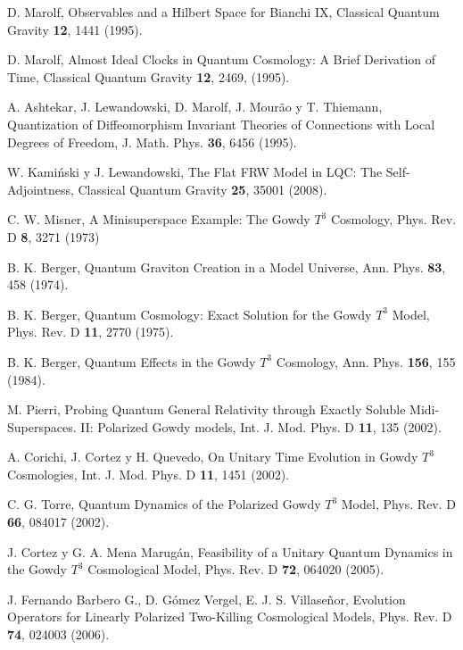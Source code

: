 \begin{thebibliography}{999}
 D. Marolf, Observables and a Hilbert Space for Bianchi IX,
Classical Quantum Gravity {\bf 12}, 1441 (1995).

 D. Marolf, Almost Ideal Clocks in Quantum Cosmology: A Brief
Derivation of Time, Classical Quantum Gravity {\bf 12}, 2469, (1995).

 A. Ashtekar, J. Lewandowski, D. Marolf, J. Mour\~ao y T. Thiemann, Quantization
of Diffeomorphism Invariant Theories of Connections with Local Degrees of Freedom, J. Math. Phys.
{\bf 36}, 6456 (1995).

 W. Kami\'nski y J. Lewandowski, The Flat FRW Model in LQC: The Self-Adjointness,
Classical Quantum Gravity {\bf 25}, 35001 (2008).






 C. W. Misner, A Minisuperspace Example: The Gowdy $T^3$ Cosmology, Phys. Rev. D
{\bf8}, 3271 (1973)

 B. K. Berger, Quantum Graviton Creation in a Model Universe, Ann. Phys. {\bf83},
458 (1974).

 B. K. Berger, Quantum Cosmology: Exact Solution for the Gowdy $T^3$ Model, Phys.
Rev. D {\bf 11}, 2770 (1975).

 B. K. Berger, Quantum Effects in the Gowdy $T^3$ Cosmology, Ann. Phys. {\bf 156},
155 (1984).

 M. Pierri, Probing Quantum General Relativity through Exactly
Soluble Midi-Superspaces. II: Polarized Gowdy models, Int. J. Mod. Phys. D {\bf11}, 135
(2002).

 A. Corichi, J. Cortez y H. Quevedo, On Unitary Time Evolution in Gowdy $T^3$
Cosmologies, Int. J. Mod. Phys. D {\bf11}, 1451 (2002). 

 C. G. Torre, Quantum Dynamics of the Polarized Gowdy $T^3$ Model, Phys. Rev. D
{\bf66}, 084017 (2002).

  J. Cortez y G. A. Mena Marug\'{a}n, Feasibility of a Unitary Quantum Dynamics in
the Gowdy $T^3$ Cosmological Model, Phys. Rev. D {\bf72}, 064020 (2005).

 J. Fernando Barbero G., D. Gómez Vergel, E. J. S. Villaseñor, Evolution
Operators for Linearly Polarized Two-Killing Cosmological Models, Phys. Rev. D {\bf74}, 024003
(2006).


\end{thebibliography}

